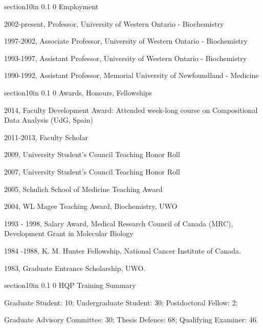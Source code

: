 \documentclass[11pt]{article}
\makeatletter
\renewcommand\section{\@startsection
	{section}{1}{0in}%
	{0.1\baselineskip}%
	{0\baselineskip}%
	{\sffamily\bfseries\large}
}
\makeatother
\begin{document}
\section{Employment}\itemsep=-2pt
\begin{description}\itemsep=-2pt
\item 2002-present, Professor, University of Western Ontario - Biochemistry
\item 1997-2002, Associate Professor, University of Western Ontario - Biochemistry
\item 1993-1997,	Assistant Professor, University of Western Ontario - Biochemistry
\item 1990-1992,	Assistant Professor, Memorial University of Newfoundland - Medicine
\end{description}

\section{Awards, Honours, Fellowships}
\begin{description}\itemsep=-2pt
\item 2014,       Faculty Development Award: Attended week-long course on Compositional Data Analysis (UdG, Spain)
\item 2011-2013,       Faculty Scholar
\item 2009,		University Student's Council Teaching Honor Roll
\item 2007,		University Student's Council Teaching Honor Roll
\item 2005,		Schulich School of Medicine Teaching Award
\item 2004,		WL Magee Teaching Award, Biochemistry, UWO
\item 1993 - 1998,	Salary Award, Medical Research Council of Canada (MRC), Development Grant in Molecular Biology
\item 1984 -1988, 	K. M. Hunter Fellowship, National Cancer Institute of Canada.
\item 1983,	       	Graduate Entrance Scholarship, UWO.
\end{description}

\section{HQP Training Summary}

\begin{description}\itemsep=-2pt
\item Graduate Student: 10;  Undergraduate Student: 30; Postdoctoral Fellow: 2; 
\item Graduate Advisory Committee: 30; Thesis Defence: 68; Qualifying Examiner: 46.
\end{description}
\end{document}

